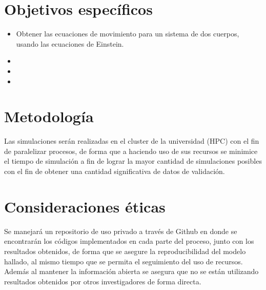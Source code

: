 \section{Objetivos específicos}
	\begin{itemize}
		\item Obtener las ecuaciones de movimiento para un sistema de dos cuerpos, usando las ecuaciones de Einstein.
		\item 
		\item 
		\item
	\end{itemize}
	
\section{Metodología}
	Las simulaciones ser\'an realizadas en el cluster de la universidad (HPC) con el fin de paralelizar procesos, de forma que a haciendo uso de sus recursos se minimice el tiempo de simulación a fin de lograr la mayor cantidad de simulaciones posibles con el fin de obtener una cantidad significativa de datos de validación.
	
\section{Consideraciones éticas}
	Se manejará un repositorio de uso privado a través de Github en donde se encontrar\'an los códigos implementados en cada parte del proceso, junto con los resultados obtenidos, de forma que se asegure la reproducibilidad del modelo hallado, al mismo tiempo que se permita el seguimiento del uso de recursos. Adem\'as al mantener la informaci\'on abierta se asegura que no se están utilizando resultados obtenidos por otros investigadores de forma directa.
	
